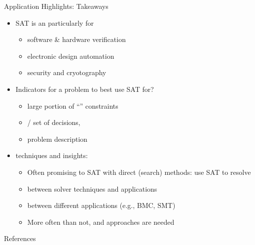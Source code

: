 \documentclass[t,english]{sdqbeamer}
\begin{document}
\begin{frame}{Application Highlights: Takeaways}
	\vspace*{-7mm}
	\begin{itemize}\setlength{\itemsep}{1ex}
		\item SAT is an  particularly for
		\begin{itemize}
			\item software \& hardware verification
			\item electronic design automation
			\item security and cryotography
		\end{itemize}
		\item Indicators for a problem to best use SAT for?
		\begin{itemize}
			\item large portion of ``'' constraints
			\item {} / set of decisions, 
			\item problem description 
		\end{itemize}
		\item {} techniques and insights:
		\begin{itemize}
			\item Often promising to  SAT with direct (search) methods: use SAT to resolve 
			\item {} between solver techniques and applications
			\item {} between different applications (e.g., BMC, SMT)
			\item More often than not,  and  approaches are needed
		\end{itemize}
	\end{itemize}
\end{frame}






\begin{frame}[allowframebreaks]{References}
	\renewcommand*{\bibfont}{\footnotesize}
	\printbibliography[heading=subbibliography]
\end{frame}
\end{document}
